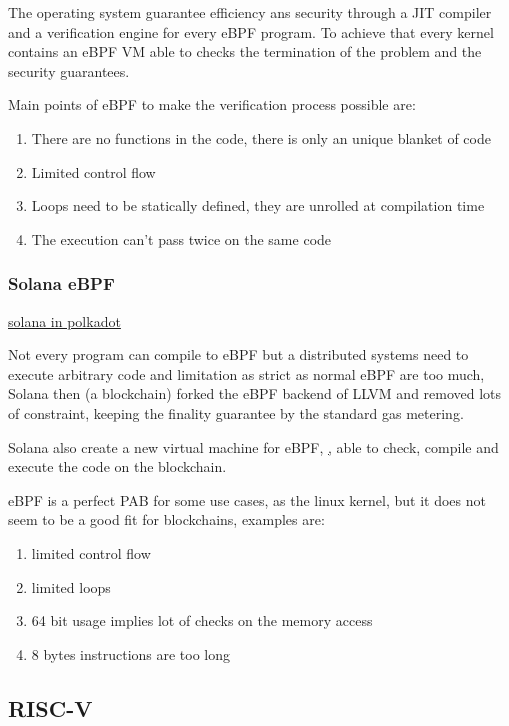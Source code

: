 \documentclass[../main.tex]{subfiles}
\begin{document}
The operating system guarantee efficiency ans security through a JIT compiler and a verification engine for every eBPF program. To achieve that every kernel contains an eBPF VM able to checks the termination of the problem and the security guarantees.

Main points of eBPF to make the verification process possible are:
\begin{enumerate}
  \item There are no functions in the code, there is only an unique blanket of code
  \item Limited control flow
  \item Loops need to be statically defined, they are unrolled at compilation time
  \item The execution can't pass twice on the same code
\end{enumerate}

\subsubsection{Solana eBPF}

\href{https://forum.polkadot.network/t/ebpf-contracts-hackathon/1084}{solana in polkadot}

Not every program can compile to eBPF but a distributed systems need to execute arbitrary code and limitation as strict as normal eBPF are too much, Solana then (a blockchain) forked the eBPF backend of LLVM and removed lots of constraint, keeping the finality guarantee by the standard gas metering.

Solana also create a new virtual machine for eBPF, \href{https://github.com/qmonnet/rbpf}, able to check, compile and execute the code on the blockchain.

eBPF is a perfect PAB for some use cases, as the linux kernel, but it does not seem to be a good fit for blockchains, examples are:
\begin{enumerate}
  \item limited control flow
  \item limited loops
  \item 64 bit usage implies lot of checks on the memory access
  \item 8 bytes instructions are too long
\end{enumerate}


\subsection{RISC-V}
\end{document}
